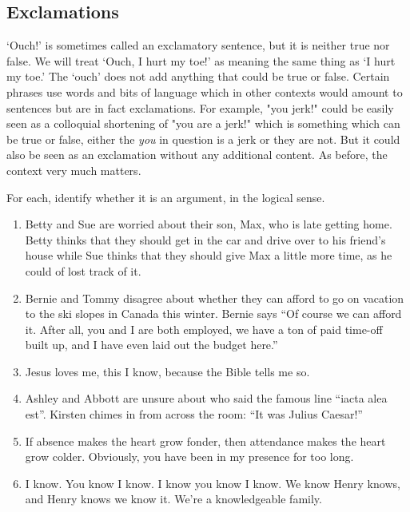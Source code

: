 \subsection{Exclamations} `Ouch!' is sometimes called an exclamatory sentence, but it is neither true nor false. We will treat `Ouch, I hurt my toe!' as meaning the same thing as `I hurt my toe.' The `ouch' does not add anything that could be true or false. Certain phrases use words and bits of language which in other contexts would amount to sentences but are in fact exclamations. For example, "you jerk!" could be easily seen as a colloquial shortening of "you are a jerk!" which is something which can be true or false, either the \emph{you} in question is a jerk or they are not. But it could also be seen as an exclamation without any additional content. As before, the context very much matters. 

\practiceproblems
\problempart
\label{pr.IDargs}
For each, identify whether it is an argument, in the logical sense.
\begin{enumerate}
\item Betty and Sue are worried about their son, Max, who is late getting home. Betty thinks that they should get in the car and drive over to his friend's house while Sue thinks that they should give Max a little more time, as he could of lost track of it. 
\item Bernie and Tommy disagree about whether they can afford to go on vacation to the ski slopes in Canada this winter. Bernie says ``Of course we can afford it. After all, you and I are both employed, we have a ton of paid time-off built up, and I have even laid out the budget here.''
\item Jesus loves me, this I know, because the Bible tells me so. 
\item Ashley and Abbott are unsure about who said the famous line ``iacta alea est''. Kirsten chimes in from across the room: ``It was Julius Caesar!''
\item If absence makes the heart grow fonder, then attendance makes the heart grow colder. Obviously, you have been in my presence for too long. 
\item I know. You know I know. I know you know I know. We know Henry knows, and Henry knows we know it. We're a knowledgeable family.
\end{enumerate}


